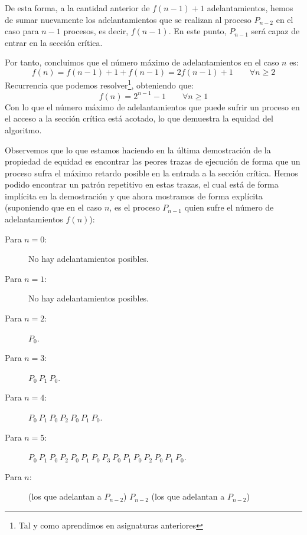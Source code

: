 \begin{description}
\begin{itemize}
                De esta forma, a la cantidad anterior de $f(n-1)+1$ adelantamientos, hemos de sumar nuevamente los adelantamientos que se realizan al proceso $P_{n-2}$ en el caso para $n-1$ procesos, es decir, $f(n-1)$. En este punto, $P_{n-1}$ será capaz de entrar en la sección crítica.
        \end{itemize}
        Por tanto, concluimos que el número máximo de adelantamientos en el caso $n$ es:
        \begin{equation*}
            f(n) = f(n-1) + 1 + f(n-1) = 2f(n-1) + 1 \qquad \forall n\geq 2
        \end{equation*}
        Recurrencia que podemos resolver\footnote{Tal y como aprendimos en asignaturas anteriores}, obteniendo que:
        \begin{equation*}
            f(n) = 2^{n-1} -1 \qquad \forall n\geq 1
        \end{equation*}
        Con lo que el número máximo de adelantamientos que puede sufrir un proceso en el acceso a la sección crítica está acotado, lo que demuestra la equidad del algoritmo.
\end{description}

\begin{ejemplo}
    Observemos que lo que estamos haciendo en la última demostración de la propiedad de equidad es encontrar las peores trazas de ejecución de forma que un proceso sufra el máximo retardo posible en la entrada a la sección crítica. Hemos podido encontrar un patrón repetitivo en estas trazas, el cual está de forma implícita en la demostración y que ahora mostramos de forma explícita (suponiendo que en el caso $n$, es el proceso $P_{n-1}$ quien sufre el número de adelantamientos $f(n)$):
    \begin{description}
        \item [Para $n=0$:] No hay adelantamientos posibles.
        \item [Para $n=1$:] No hay adelantamientos posibles.
        \item [Para $n=2$:] $P_0$.
        \item [Para $n=3$:] $P_0\ P_1\ P_0$.
        \item [Para $n=4$:] $P_0\ P_1\ P_0\ P_2\ P_0\ P_1\ P_0$.
        \item [Para $n=5$:] $P_0\ P_1\ P_0\ P_2\ P_0\ P_1\ P_0\ P_3\ P_0\ P_1\ P_0\ P_2\ P_0\ P_1\ P_0$.
        \item [Para $n$:] (los que adelantan a $P_{n-2}$) $P_{n-2}$ (los que adelantan a $P_{n-2}$)
    \end{description}
\end{ejemplo}


